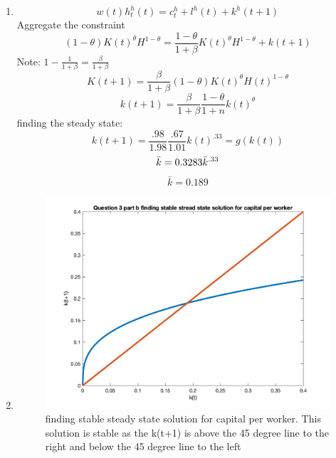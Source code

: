 \begin{enumerate}
    \item  
   $$ w(t)h^h_t(t)=c^h_t+l^h(t)+k^h(t+1)$$
   Aggregate the constraint
   $$(1-\theta)K(t)^\theta H^{1-\theta}=\frac{1-\theta}{1+\beta}K(t)^\theta H^{1-\theta}+k(t+1)$$
   Note: $1-\frac{1}{1+\beta}=\frac{\beta}{1+\beta}$
   $$K(t+1)=\frac{\beta}{1+\beta}(1-\theta)K(t)^\theta H(t)^{1-\theta}$$
   $$k(t+1)=\frac{\beta}{1+\beta}\frac{1-\theta}{1+n}k(t)^\theta$$
   finding the steady state:
    $$k(t+1)=\frac{.98}{1.98}\frac{.67}{1.01}k(t)^{.33}=g(k(t))$$
     $$\bar{k}=0.3283\Bar{k}^{.33}$$
     $$\bar{k}=0.189$$
     \item
     \begin{figure}[H]
        \centering
        \includegraphics[width =.75\linewidth]{HW2/pics/HW1_Q3_b.png}
        \caption{finding stable steady state solution for capital per worker. This solution is stable as the k(t+1) is above the 45 degree line to the right and below the 45 degree line to the left}
    \end{figure}
\end{enumerate}